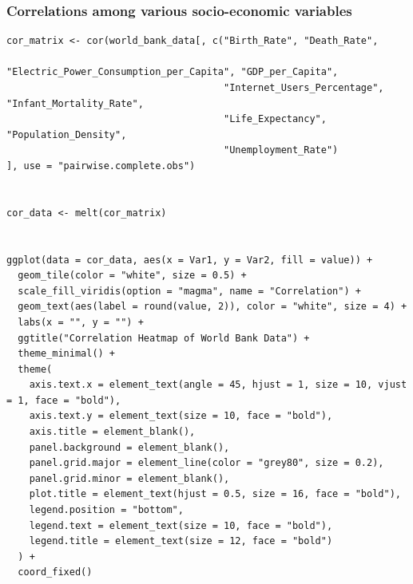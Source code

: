 \documentclass{article}\usepackage[]{graphicx}\usepackage[]{xcolor}
\begin{document}
\subsubsection{Correlations among various socio-economic variables}
\begin{lstlisting}
cor_matrix <- cor(world_bank_data[, c("Birth_Rate", "Death_Rate", 
                                      "Electric_Power_Consumption_per_Capita", "GDP_per_Capita", 
                                      "Internet_Users_Percentage", "Infant_Mortality_Rate", 
                                      "Life_Expectancy", "Population_Density", 
                                      "Unemployment_Rate")
], use = "pairwise.complete.obs")


cor_data <- melt(cor_matrix)


ggplot(data = cor_data, aes(x = Var1, y = Var2, fill = value)) +
  geom_tile(color = "white", size = 0.5) + 
  scale_fill_viridis(option = "magma", name = "Correlation") + 
  geom_text(aes(label = round(value, 2)), color = "white", size = 4) +
  labs(x = "", y = "") +
  ggtitle("Correlation Heatmap of World Bank Data") +
  theme_minimal() +  
  theme(
    axis.text.x = element_text(angle = 45, hjust = 1, size = 10, vjust = 1, face = "bold"),
    axis.text.y = element_text(size = 10, face = "bold"),
    axis.title = element_blank(),  
    panel.background = element_blank(),
    panel.grid.major = element_line(color = "grey80", size = 0.2),  
    panel.grid.minor = element_blank(),
    plot.title = element_text(hjust = 0.5, size = 16, face = "bold"),
    legend.position = "bottom",
    legend.text = element_text(size = 10, face = "bold"),
    legend.title = element_text(size = 12, face = "bold")
  ) +
  coord_fixed()


\end{lstlisting}
\newpage
\end{document}

